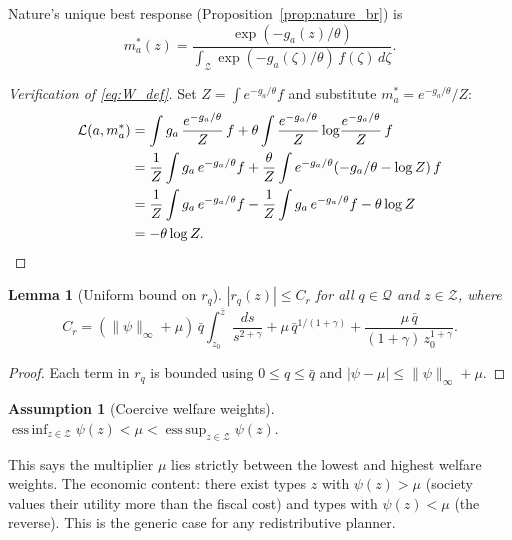 \documentclass[12pt,a4paper]{article}
\theoremstyle{definition}
\newtheorem{assumption}{Assumption}[section]
\theoremstyle{plain}
\newtheorem{lemma}{Lemma}[section]
\theoremstyle{remark}
\newcommand{\zbar}{\bar{z}}
\newcommand{\zlow}{z_{\scriptscriptstyle 0}}
\newcommand{\calZ}{\mathcal{Z}}
\newcommand{\calL}{\mathcal{L}}
\begin{document}
Nature's unique best response
(Proposition~\ref{prop:nature_br}) is
\begin{equation}
\label{eq:m_star_explicit}
  m_a^*(z) = \frac{\exp(-g_a(z)/\theta)}
  {\int_\calZ \exp(-g_a(\zeta)/\theta)\,f(\zeta)\,d\zeta}.
\end{equation}

\begin{proof}[Verification of \eqref{eq:W_def}]
Set $Z = \int e^{-g_a/\theta}f$ and substitute
$m_a^* = e^{-g_a/\theta}/Z$:
\begin{align*}
  \calL(a, m_a^*)
  &= \int g_a\,\frac{e^{-g_a/\theta}}{Z}\,f
  + \theta \int \frac{e^{-g_a/\theta}}{Z}
    \log\!\frac{e^{-g_a/\theta}}{Z}\,f \\
  &= \frac{1}{Z}\int g_a\,e^{-g_a/\theta}f
  + \frac{\theta}{Z}\int e^{-g_a/\theta}
    (-g_a/\theta - \log Z)\,f \\
  &= \frac{1}{Z}\int g_a\,e^{-g_a/\theta}f
  - \frac{1}{Z}\int g_a\,e^{-g_a/\theta}f
  - \theta\log Z \\
  &= -\theta\log Z.\qedhere
\end{align*}
\end{proof}

\begin{lemma}[Uniform bound on $r_q$]
\label{lem:Cr_bound}
$|r_q(z)| \leq C_r$ for all $q \in \mathcal{Q}$ and
$z \in \calZ$, where
\begin{equation}
\label{eq:Cr}
  C_r = (\|\psi\|_\infty + \mu)\,\bar q
  \int_{\zlow}^{\zbar}\frac{ds}{s^{2+\gamma}}
  + \mu\,\bar q^{1/(1+\gamma)}
  + \frac{\mu\,\bar q}{(1+\gamma)\,\zlow^{1+\gamma}}.
\end{equation}
\end{lemma}

\begin{proof}
Each term in $r_q$ is bounded using
$0 \leq q \leq \bar q$ and
$|\psi - \mu| \leq \|\psi\|_\infty + \mu$.
\end{proof}

\begin{assumption}[Coercive welfare weights]
\label{as:mu_interior}
$\operatorname*{ess\,inf}_{z \in \calZ} \psi(z)
< \mu
< \operatorname*{ess\,sup}_{z \in \calZ} \psi(z)$.
\end{assumption}

This says the multiplier $\mu$ lies strictly between the
lowest and highest welfare weights.  The economic content:
there exist types $z$ with $\psi(z) > \mu$ (society values
their utility more than the fiscal cost) and types with
$\psi(z) < \mu$ (the reverse).  This is the generic case
for any redistributive planner.
\end{document}
